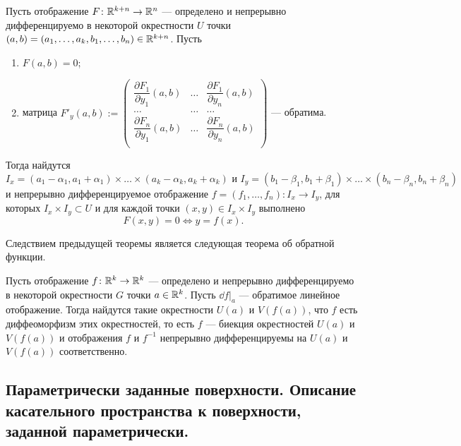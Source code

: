 \documentclass[a4paper]{article}
\theoremstyle{named}
\begin{document}
    \begin{theorem*}
        Пусть отображение $F\colon \mathbb{R}^{k+n}\to \mathbb{R}^n$ --- определено и непрерывно дифференцируемо в некоторой окрестности $U$ точки $(a,b)=(a_1,\ldots, a_k,b_1,\ldots, b_n)\in \mathbb{R}^{k+n}$.
        Пусть
        \begin{enumerate}
        \item
            $F(a, b) = 0$;
    
        \item
            матрица
            $F'_y(a,b):=
            \begin{pmatrix}
                \dfrac{\partial F_1}{\partial y_1}(a,b) & \ldots & \dfrac{\partial F_1}{\partial y_n}(a,b) \\
                \ldots & \ldots & \ldots \\
                \dfrac{\partial F_n}{\partial y_1}(a,b) & \ldots & \dfrac{\partial F_n}{\partial y_n}(a,b) \\
            \end{pmatrix}$
            --- обратима.
        \end{enumerate}
    
        Тогда найдутся
        $$
            I_x = (a_1-\alpha_1, a_1+\alpha_1)\times\ldots\times (a_k-\alpha_k, a_k+\alpha_k) 
            \text{ и }
            I_y=(b_1-\beta_1, b_1+\beta_1)\times\ldots\times(b_n-\beta_n, b_n+\beta_n)
        $$
        и непрерывно дифференцируемое отображение $f=(f_1,\ldots, f_n)\colon I_x\to I_y$, для которых $I_x\times I_y\subset U$ и для каждой точки $(x,y)\in I_x\times I_y$ выполнено 
        $$F(x,y)=0 \Leftrightarrow y=f(x).$$
    \end{theorem*}

    Следствием предыдущей теоремы является следующая теорема об обратной функции.

    \begin{theorem*}
        Пусть отображение $f\colon \mathbb{R}^{k}\to \mathbb{R}^k$ --- определено и непрерывно дифференцируемо в некоторой окрестности $G$ точки $a\in \mathbb{R}^k$.
        Пусть $\dd f\bigl|_{a}$ --- обратимое линейное отображение.
        Тогда найдутся такие окрестности $U(a)$ и $V(f(a))$, что $f$ есть диффеоморфизм этих окрестностей, то есть $f$ --- биекция окрестностей $U(a)$ и $V(f(a))$ и отображения $f$ и $f^{-1}$ непрерывно дифференцируемы на $U(a)$ и $V(f(a))$ соответственно.
    \end{theorem*}

    \subsection{Параметрически заданные поверхности. Описание касательного пространства к поверхности, заданной параметрически.}
\end{document}
